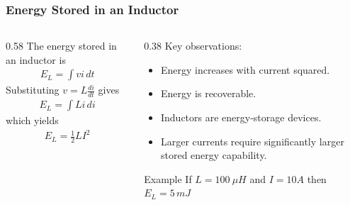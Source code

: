 \begin{frame} 
    \frametitle{Energy Stored in an Inductor} 
    \begin{columns} 
        \begin{column}{0.58\textwidth} 
            The energy stored in an inductor is 
            \begin{align} 
                E_L = \int vi\,dt 
            \end{align} 
            Substituting 
                $v=L\frac{di}{dt}$ 
            gives 
            \begin{align} 
                E_L = \int Li\,di 
            \end{align} 
            which yields 
            \begin{align} 
                E_L = \frac12 LI^2 
            \end{align} 
            \vspace{0.15cm} 


        \end{column} 
        \begin{column}{0.38\textwidth}
            Key observations:  
            \begin{itemize} 
                \item Energy increases with current squared. 
                \item Energy is recoverable. 
                \item Inductors are energy-storage devices. 
                \item Larger currents require significantly larger stored energy capability. 
            \end{itemize} 
            \begin{block}{Example} 
                If $L=100\ \mu H $ and $I=10A$ then $E_L=5\,mJ$ 
            \end{block} 
        \end{column} 
    \end{columns} 
\end{frame}


